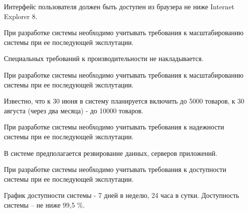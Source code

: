 

Интерфейс пользователя должен быть доступен из браузера не ниже Internet Explorer 8.


При разработке системы необходимо учитывать требования к масштабированию системы при ее последующей эксплутации. 

Специальных требований к производительности не накладывается.



При разработке системы необходимо учитывать требования к масштабированию системы при ее последующей эксплутации. 

Известно, что к 30 июня в систему планируется включить до 5000 товаров, к 30 августа (через два месяца) - до 10000 товаров. 


При разработке системы необходимо учитывать требования к надежности системы при ее последующей эксплутации. 

В системе предполагается резвирование данных, серверов приложений. 


При разработке системы необходимо учитывать требования к доступности системы при ее последующей эксплутации. 

График доступности системы - 7 дней в неделю, 24 часа в сутки. 
Доступность системы -- не ниже 99,5 \%. 

